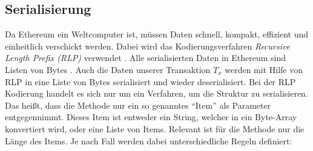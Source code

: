 \documentclass[runningheads]{llncs}
\begin{document}
\subsection{Serialisierung}
Da Ethereum ein Weltcomputer ist, müssen Daten schnell, kompakt, effizient und einheitlich verschickt werden. Dabei wird das Kodierungsverfahren \textit{Recursive Length Prefix (RLP)} verwendet \cite[S. 100]{antonopoulos_mastering_2019}. Alle serialisierten Daten in Ethereum sind Listen von Bytes \cite[S. 3]{wood_ethereum/yellowpaper_2019}. Auch die Daten unserer Transaktion $T_x$ werden mit Hilfe von RLP in eine Liste von Bytes serialisiert und wieder deserialisiert. Bei der RLP Kodierung handelt es sich nur um ein Verfahren, um die Struktur zu serialisieren. Das heißt, dass die Methode nur ein so genanntes "`Item"' als Parameter entgegennimmt. Dieses Item ist entweder ein String, welcher in ein Byte-Array konvertiert wird, oder eine Liste von Items. Relevant ist für die Methode nur die Länge des Items. Je nach Fall werden dabei unterschiedliche Regeln definiert:
\end{document}
